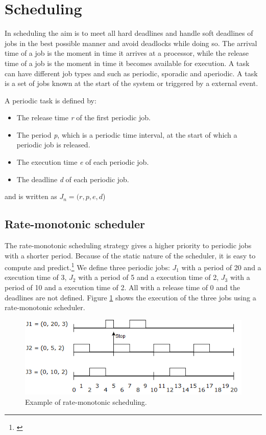 \section{Scheduling} \label{sc:scheduling}
In scheduling the aim is to meet all hard deadlines and handle soft deadlines of jobs in the best possible manner and avoid deadlocks while doing so. The arrival time of a job is the moment in time it arrives at a processor, while the release time of a job is the moment in time it becomes available for execution. A task can have different job types and such as periodic, sporadic and aperiodic. A task is a set of jobs known at the start of the system or triggered by a external event.

\noindent A periodic task is defined by:
\begin{itemize}
	\itemsep0em
	\item The release time \textit{r} of the first periodic job.
	\item The period \textit{p}, which is a periodic time interval, at the start of which a periodic job is released.
	\item The execution time \textit{e} of each periodic job.
	\item The deadline \textit{d} of each periodic job.
\end{itemize}
and is written as $J_n=(r,p,e,d$)

\subsection{Rate-monotonic scheduler}
The rate-monotonic scheduling strategy gives a higher priority to periodic jobs with a shorter period. Because of the static nature of the scheduler, it is easy to compute and predict.\footnote{\cite[p.~183]{Fokkink1965}}
We define three periodic jobs: $J_1$ with a period of 20 and a execution time of 3, $J_2$ with a period of 5 and a execution time of 2, $J_3$ with a period of 10 and a execution time of 2. All with a release time of 0 and the deadlines are not defined. Figure \ref{fig:rateMonotonicExample} shows the execution of the three jobs using a rate-monotonic scheduler.

\begin{figure}[!ht]
	\centering
	\includegraphics[scale=0.5]{realTimeComputing/fig/rate-mono.png}
	\caption{Example of rate-monotonic scheduling.}
	\label{fig:rateMonotonicExample}
\end{figure}

